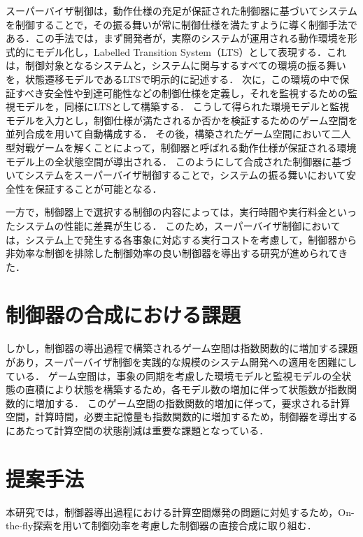 \documentclass[11pt]{jarticle}
\begin{document}
スーパーバイザ制御は，動作仕様の充足が保証された制御器に基づいてシステムを制御することで，その振る舞いが常に制御仕様を満たすように導く制御手法である．この手法では，まず開発者が，実際のシステムが運用される動作環境を形式的にモデル化し，Labelled Transition System（LTS）として表現する．これは，制御対象となるシステムと，システムに関与するすべての環境の振る舞いを，状態遷移モデルであるLTSで明示的に記述する．
次に，この環境の中で保証すべき安全性や到達可能性などの制御仕様を定義し，それを監視するための監視モデルを，同様にLTSとして構築する．
こうして得られた環境モデルと監視モデルを入力とし，制御仕様が満たされるか否かを検証するためのゲーム空間を並列合成を用いて自動構成する．
その後，構築されたゲーム空間において二人型対戦ゲームを解くことによって，制御器と呼ばれる動作仕様が保証される環境モデル上の全状態空間が導出される．
このようにして合成された制御器に基づいてシステムをスーパーバイザ制御することで，システムの振る舞いにおいて安全性を保証することが可能となる．

一方で，制御器上で選択する制御の内容によっては，実行時間や実行料金といったシステムの性能に差異が生じる．
このため，スーパーバイザ制御においては，システム上で発生する各事象に対応する実行コストを考慮して，制御器から非効率な制御を排除した制御効率の良い制御器を導出する研究が進められてきた\cite{eze}．


\section{制御器の合成における課題}
しかし，制御器の導出過程で構築されるゲーム空間は指数関数的に増加する課題があり，スーパーバイザ制御を実践的な規模のシステム開発への適用を困難にしている．
ゲーム空間は，事象の同期を考慮した環境モデルと監視モデルの全状態の直積により状態を構築するため，各モデル数の増加に伴って状態数が指数関数的に増加する．
このゲーム空間の指数関数的増加に伴って，要求される計算空間，計算時間，必要主記憶量も指数関数的に増加するため，制御器を導出するにあたって計算空間の状態削減は重要な課題となっている．


\section{提案手法}
本研究では，制御器導出過程における計算空間爆発の問題に対処するため，On-the-fly探索を用いて制御効率を考慮した制御器の直接合成に取り組む．
\end{document}
